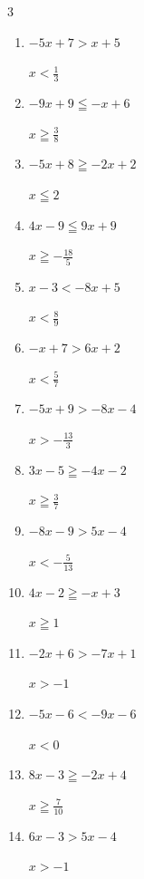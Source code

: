 \begin{multicols}{3}
\begin{enumerate}
  \item $-5x+7>x+5$

        $\displaystyle x<\frac{1}{3}$

  \item $-9x+9\leqq -x+6$

        $\displaystyle x\geqq \frac{3}{8}$

  \item $-5x+8\geqq -2x+2$

        $\displaystyle x\leqq 2$

  \item $4x-9\leqq 9x+9$

        $\displaystyle x\geqq -\frac{18}{5}$

  \item $x-3<-8x+5$

        $\displaystyle x<\frac{8}{9}$

\columnbreak %

\resetques

  \item $-x+7>6x+2$

        $\displaystyle x<\frac{5}{7}$

  \item $-5x+9>-8x-4$

        $\displaystyle x>-\frac{13}{3}$

  \item $3x-5\geqq -4x-2$

        $\displaystyle x\geqq \frac{3}{7}$

  \item $-8x-9>5x-4$

        $\displaystyle x<-\frac{5}{13}$

  \item $4x-2\geqq -x+3$

        $\displaystyle x\geqq 1$

  \item $-2x+6>-7x+1$

        $\displaystyle x>-1$

  \item $-5x-6<-9x-6$

        $\displaystyle x<0$

  \item $8x-3\geqq -2x+4$

        $\displaystyle x\geqq \frac{7}{10}$

  \item $6x-3>5x-4$

        $\displaystyle x>-1$


\end{enumerate}
\end{multicols}
